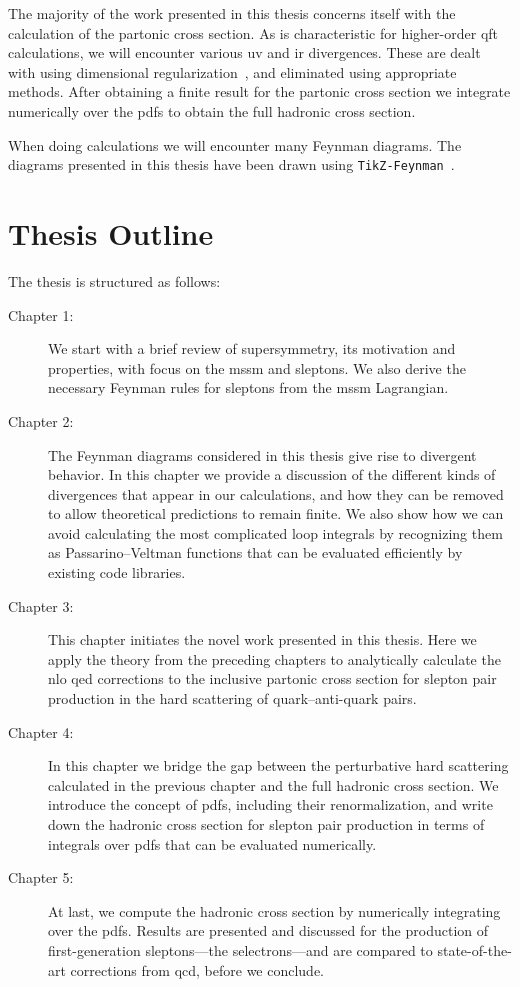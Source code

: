 The majority of the work presented in this thesis concerns itself with the calculation of the partonic cross section.
As is characteristic for higher-order \gls{qft} calculations, we will encounter various \gls{uv} and \gls{ir} divergences.
These are dealt with using dimensional regularization~\cite{tHooft:1972tcz,Bollini:1972ui}, and eliminated using appropriate methods.
After obtaining a finite result for the partonic cross section we integrate numerically over the \glspl{pdf} to obtain the full hadronic cross section.

When doing calculations we will encounter many Feynman diagrams. The diagrams presented in this thesis have been drawn using \texttt{TikZ-Feynman}~\cite{Ellis:2016jkw}.


\section*{Thesis Outline}
The thesis is structured as follows:
\begin{description}
    \item[Chapter 1:] We start with a brief review of supersymmetry, its motivation and properties, with focus on the \gls{mssm} and sleptons. We also derive the necessary Feynman rules for sleptons from the \gls{mssm} Lagrangian.
    
    \item[Chapter 2:] The Feynman diagrams considered in this thesis give rise to divergent behavior.
    In this chapter we provide a discussion of the different kinds of divergences that appear in our calculations, and how they can be removed to allow theoretical predictions to remain finite.
    We also show how we can avoid calculating the most complicated loop integrals by recognizing them as Passarino--Veltman functions that can be evaluated efficiently by existing code libraries.

    \item[Chapter 3:] This chapter initiates the novel work presented in this thesis.
    Here we apply the theory from the preceding chapters to analytically calculate the \gls{nlo} \gls{qed} corrections to the inclusive partonic cross section for slepton pair production in the hard scattering of quark--anti-quark pairs.

    \item[Chapter 4:] In this chapter we bridge the gap between the perturbative hard scattering calculated in the previous chapter and the full hadronic cross section.
    We introduce the concept of \glspl{pdf}, including their renormalization, and write down the hadronic cross section for slepton pair production in terms of integrals over \glspl{pdf} that can be evaluated numerically.

    \item[Chapter 5:] At last, we compute the hadronic cross section by numerically integrating over the \glspl{pdf}. Results are presented and discussed for the production of first-generation sleptons---the selectrons---and are compared to state-of-the-art corrections from \gls{qcd}, before we conclude.
\end{description}